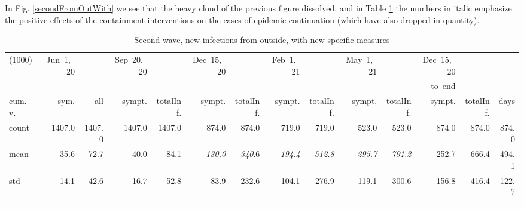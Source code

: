 \documentclass[graybox]{svmult}
\begin{document}
In Fig. \ref{secondFromOutWith} we see that the heavy cloud of the previous figure dissolved, and in Table \ref{selForceWave2Contr2Tab} the numbers in italic emphasize the positive effects of the containment interventions on the cases of epidemic continuation (which have also dropped in quantity).


\begin{table}[t]
\center
\tiny
\begin{tabular}{lrrrrrrrrrrrrr}
\hline\noalign{\smallskip}
(1000) & Jun~1,~20 & & Sep~20,~20 & & Dec~15,~20 & & Feb~1,~21 & & May~1,~21 & & Dec~15,~20 \\
& & & & & & & & & & & to~end \\
cum.~v. & sym. & all & sympt. & totalInf. & sympt. & totalInf. & sympt. & totalInf. & sympt. & totalInf. & sympt. & totalInf. & days\\
\noalign{\smallskip}\svhline\noalign{\smallskip}
count & 1407.0 & 1407.0 & 1407.0 & 1407.0 & 874.0 & 874.0 & 719.0 & 719.0 & 523.0 & 523.0 & 874.0 & 874.0 & 874.0 \\
mean & 35.6 & 72.7 & 40.0 & 84.1 & \emph{130.0} & \emph{340}.6 & \emph{194.4} & \emph{512.8} & \emph{295.7} & \emph{791.2} & 252.7 & 666.4 & 494.1 \\
std & 14.1 & 42.6 & 16.7 & 52.8 & 83.9 & 232.6 & 104.1 & 276.9 & 119.1 & 300.6 & 156.8 & 416.4 & 122.7 \\
\hline\noalign{\smallskip}
\end{tabular}
\caption{Second wave, new infections from outside, with new specific measures}
\label{selForceWave2Contr2Tab}
\end{table}



\end{document}
